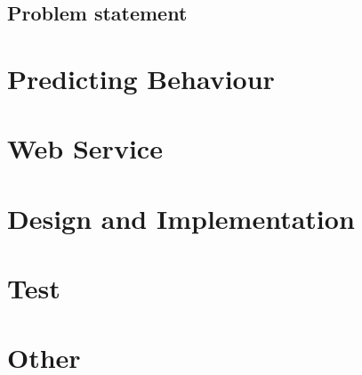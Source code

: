 \section{Problem statement}


\chapter{Predicting Behaviour}



\chapter{Web Service}


\chapter{Design and Implementation}












\chapter{Test}


\chapter{Other}



\appendix







